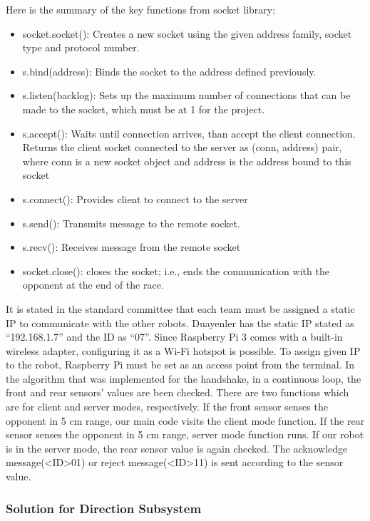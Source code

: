 \documentclass[a4paper,12pt]{article}
\begin{document}
			Here is the summary of the key functions from socket library:
			
			\begin{itemize}
				\item socket.socket(): Creates a new socket using the given address family, socket type and protocol number.
				\item s.bind(address): Binds the socket to the address defined previously.
      \item s.listen(backlog): Sets up the maximum number of connections that can be made to the socket, which must be at 1 for the project.
\item	s.accept(): Waits until connection arrives, than accept the client connection. Returns the client socket connected to the server as (conn, address) pair, where conn is a new socket object and address is the address bound to this socket
\item	s.connect(): Provides client to connect to the server
\item	s.send(): Transmits message to the remote socket.
\item	s.recv(): Receives message from the remote socket
\item	socket.close(): closes the socket; i.e., ends the communication with the opponent at the end of the race.
			\end{itemize}

			It is stated in the standard committee that each team must be assigned a static IP to communicate with the other robots. Duayenler has the static IP stated as “192.168.1.7” and the ID as “07”. Since Raspberry Pi 3 comes with a built-in wireless adapter, configuring it as a Wi-Fi hotspot is possible. To assign given IP to the robot, Raspberry Pi must be set as an access point from the terminal.
  In the algorithm that was implemented for the handshake, in a continuous loop, the front and rear sensors’ values are been checked. There are two functions which are for client and server modes, respectively. If the front sensor senses the opponent in 5 cm range, our main code visits the client mode function. If the rear sensor senses the opponent in 5 cm range, server mode function runs. If our robot is in the server mode, the rear sensor value is again checked. The acknowledge message(<ID>01) or reject message(<ID>11) is sent according to the sensor value.


		
		\subsubsection{Solution for Direction Subsystem}
		
\end{document}

